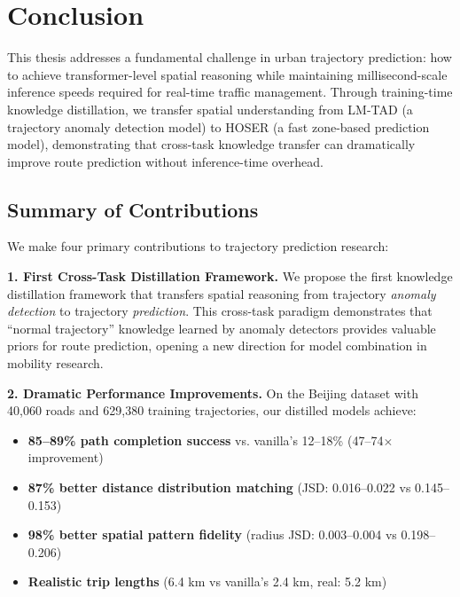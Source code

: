 
\section{Conclusion}
\label{sec:conclusion}

This thesis addresses a fundamental challenge in urban trajectory prediction: how to achieve transformer-level spatial reasoning while maintaining millisecond-scale inference speeds required for real-time traffic management. Through training-time knowledge distillation, we transfer spatial understanding from LM-TAD (a trajectory anomaly detection model) to HOSER (a fast zone-based prediction model), demonstrating that cross-task knowledge transfer can dramatically improve route prediction without inference-time overhead.

\subsection{Summary of Contributions}
\label{sec:conclusion-contributions}

We make four primary contributions to trajectory prediction research:

\textbf{1. First Cross-Task Distillation Framework.} We propose the first knowledge distillation framework that transfers spatial reasoning from trajectory \emph{anomaly detection} to trajectory \emph{prediction}. This cross-task paradigm demonstrates that ``normal trajectory'' knowledge learned by anomaly detectors provides valuable priors for route prediction, opening a new direction for model combination in mobility research.

\textbf{2. Dramatic Performance Improvements.} On the Beijing dataset with 40,060 roads and 629,380 training trajectories, our distilled models achieve:
\begin{itemize}[noitemsep,topsep=0pt]
\item \textbf{85--89\% path completion success} vs. vanilla's 12--18\% (47--74$\times$ improvement)
\item \textbf{87\% better distance distribution matching} (JSD: 0.016--0.022 vs 0.145--0.153)
\item \textbf{98\% better spatial pattern fidelity} (radius JSD: 0.003--0.004 vs 0.198--0.206)
\item \textbf{Realistic trip lengths} (6.4 km vs vanilla's 2.4 km, real: 5.2 km)
\end{itemize}

